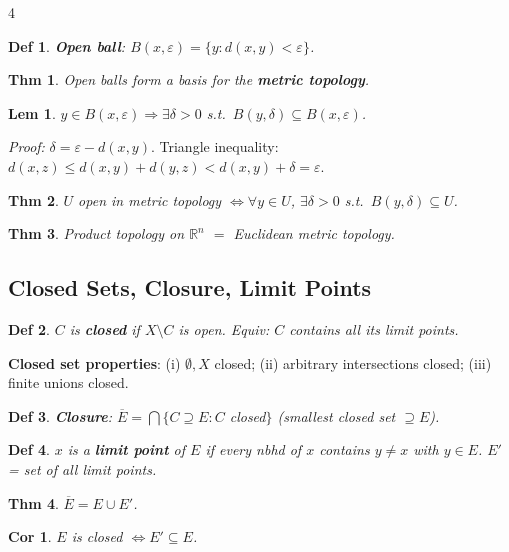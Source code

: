 \documentclass[9pt,landscape]{extarticle}
\newcommand{\R}{\mathbb{R}}
\newcommand{\eps}{\varepsilon}
\theoremstyle{compact}
\newtheorem*{thm}{Thm}
\newtheorem*{defn}{Def}
\newtheorem*{lem}{Lem}
\newtheorem*{cor}{Cor}
\begin{document}
\begin{multicols}{4}
\begin{defn}
\textbf{Open ball}: $B(x,\eps) = \{y : d(x,y) < \eps\}$.
\end{defn}

\begin{thm}
Open balls form a basis for the \textbf{metric topology}.
\end{thm}

\begin{lem}
$y \in B(x,\eps) \Rightarrow \exists \delta > 0$ s.t.\ $B(y,\delta) \subseteq B(x,\eps)$.
\end{lem}
\textit{Proof:} $\delta = \eps - d(x,y)$. Triangle inequality: $d(x,z) \leq d(x,y) + d(y,z) < d(x,y) + \delta = \eps$.

\begin{thm}
$U$ open in metric topology $\Leftrightarrow \forall y \in U$, $\exists \delta > 0$ s.t.\ $B(y,\delta) \subseteq U$.
\end{thm}

\begin{thm}
Product topology on $\R^n$ $=$ Euclidean metric topology.
\end{thm}

\subsection{Closed Sets, Closure, Limit Points}
\begin{defn}
$C$ is \textbf{closed} if $X \setminus C$ is open. Equiv: $C$ contains all its limit points.
\end{defn}

\textbf{Closed set properties}: (i) $\emptyset, X$ closed; (ii) arbitrary intersections closed; (iii) finite unions closed.

\begin{defn}
\textbf{Closure}: $\overline{E} = \bigcap\{C \supseteq E : C$ closed$\}$ (smallest closed set $\supseteq E$).
\end{defn}

\begin{defn}
$x$ is a \textbf{limit point} of $E$ if every nbhd of $x$ contains $y \neq x$ with $y \in E$. $E'$ = set of all limit points.
\end{defn}

\begin{thm}
$\overline{E} = E \cup E'$.
\end{thm}

\begin{cor}
$E$ is closed $\Leftrightarrow E' \subseteq E$.
\end{cor}


\end{multicols}
\end{document}
